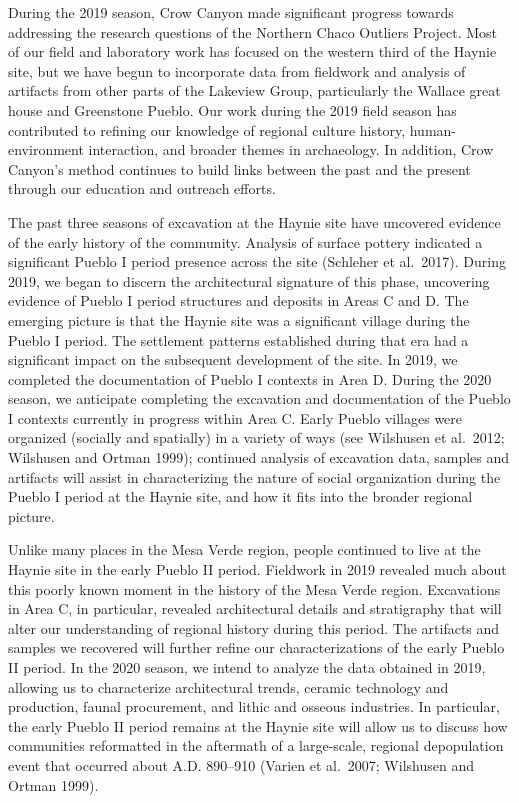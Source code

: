 \documentclass[
  12pt,
]{krantz}
\begin{document}
During the 2019 season, Crow Canyon made significant progress towards
addressing the research questions of the Northern Chaco Outliers
Project. Most of our field and laboratory work has focused on the
western third of the Haynie site, but we have begun to incorporate data
from fieldwork and analysis of artifacts from other parts of the
Lakeview Group, particularly the Wallace great house and Greenstone
Pueblo. Our work during the 2019 field season has contributed to
refining our knowledge of regional culture history, human-environment
interaction, and broader themes in archaeology. In addition, Crow
Canyon's method continues to build links between the past and the
present through our education and outreach efforts.

The past three seasons of excavation at the Haynie site have uncovered
evidence of the early history of the community. Analysis of surface
pottery indicated a significant Pueblo I period presence across the site
(Schleher et al.~2017). During 2019, we began to discern the
architectural signature of this phase, uncovering evidence of Pueblo I
period structures and deposits in Areas C and D. The emerging picture is
that the Haynie site was a significant village during the Pueblo I
period. The settlement patterns established during that era had a
significant impact on the subsequent development of the site. In 2019,
we completed the documentation of Pueblo I contexts in Area D. During
the 2020 season, we anticipate completing the excavation and
documentation of the Pueblo I contexts currently in progress within Area
C. Early Pueblo villages were organized (socially and spatially) in a
variety of ways (see Wilshusen et al.~2012; Wilshusen and Ortman 1999);
continued analysis of excavation data, samples and artifacts will assist
in characterizing the nature of social organization during the Pueblo I
period at the Haynie site, and how it fits into the broader regional
picture.

Unlike many places in the Mesa Verde region, people continued to live at
the Haynie site in the early Pueblo II period. Fieldwork in 2019
revealed much about this poorly known moment in the history of the Mesa
Verde region. Excavations in Area C, in particular, revealed
architectural details and stratigraphy that will alter our understanding
of regional history during this period. The artifacts and samples we
recovered will further refine our characterizations of the early Pueblo
II period. In the 2020 season, we intend to analyze the data obtained in
2019, allowing us to characterize architectural trends, ceramic
technology and production, faunal procurement, and lithic and osseous
industries. In particular, the early Pueblo II period remains at the
Haynie site will allow us to discuss how communities reformatted in the
aftermath of a large-scale, regional depopulation event that occurred
about A.D. 890--910 (Varien et al.~2007; Wilshusen and Ortman 1999).
\end{document}
